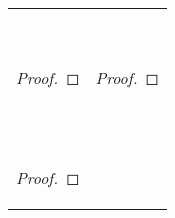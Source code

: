 \begin{exercises}
\vspace{-.5cm}
\begin{longtabu}{X[1.4]X[1]} 

\item \textcolor{white}{.}  
\vspace{-16pt}
\begin{proof}
	 
	 {}
	 {}
	\end{proof}


&

\item \textcolor{white}{.} 
\vspace{-16pt}

	\begin{proof}
	 
	 
	 
	 \by{}{}
	\end{proof}


\\

\item \textcolor{white}{.} 
\vspace{-16pt}
	\begin{proof}
	 
	\end{proof}



\end{longtabu}
\end{exercises}
